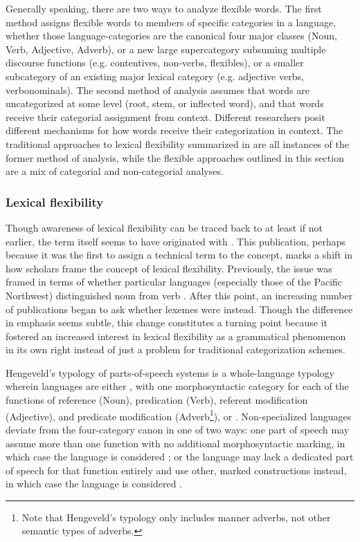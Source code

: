 Generally speaking, there are two ways to analyze flexible words. The first method assigns flexible words to members of specific categories in a language, whether those language-categories are the canonical four major classes (Noun, Verb, Adjective, Adverb), or a new large supercategory subsuming multiple discourse functions (e.g. contentives, non-verbs, flexibles), or a smaller subcategory of an existing major lexical category (e.g. adjective verbs, verbonominals). The second method of analysis assumes that words are uncategorized at some level (root, stem, or inflected word), and that words receive their categorial assignment from context. Different researchers posit different mechanisms for how words receive their categorization in context. The traditional approaches to lexical flexibility summarized in  are all instances of the former method of analysis, while the flexible approaches outlined in this section are a mix of categorial and non-categorial analyses.

\subsubsection{Lexical flexibility}
\label{sec:2.3.1.1}

Though awareness of lexical flexibility can be traced back to at least \textcite[174--177]{Gallatin1836} if not earlier, the term  itself seems to have originated with \textcite[Ch.~4]{Hengeveld1992}. This publication, perhaps because it was the first to assign a technical term to the concept, marks a shift in how scholars frame the concept of lexical flexibility. Previously, the issue was framed in terms of whether particular languages (especially those of the Pacific Northwest) distinguished noun from verb \parencites{Kuipers1968}{Jacobsen1979}{Hebert1983}{Kinkade1983}{EijkHess1986}{JelinekDemers1994}. After this point, an increasing number of publications began to ask whether lexemes were  instead. Though the difference in emphasis seems subtle, this change constitutes a turning point because it fostered an increased interest in lexical flexibility as a grammatical phenomenon in its own right instead of just a problem for traditional categorization schemes.

Hengeveld's \citeyear[Ch.~4]{Hengeveld1992} typology of parts-of-speech systems is a whole-language typology wherein languages are either , with one morphosyntactic category for each of the functions of reference (Noun), predication (Verb), referent modification (Adjective), and predicate modification (Adverb\footnote{Note that Hengeveld's typology only includes manner adverbs, not other semantic types of adverbs.}), or . Non-specialized languages deviate from the four-category canon in one of two ways: one part of speech may assume more than one function with no additional morphosyntactic marking, in which case the language is considered ; or the language may lack a dedicated part of speech for that function entirely and use other, marked constructions instead, in which case the language is considered .

